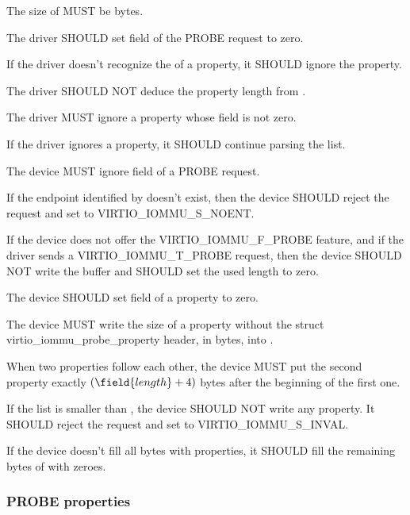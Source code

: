 The size of  MUST be  bytes.

The driver SHOULD set field  of the PROBE request to zero.

If the driver doesn't recognize the  of a property, it SHOULD
ignore the property.

The driver SHOULD NOT deduce the property length from .

The driver MUST ignore a property whose  field is not
zero.

If the driver ignores a property, it SHOULD continue parsing the list.


The device MUST ignore field  of a PROBE request.

If the endpoint identified by  doesn't exist, then the
device SHOULD reject the request and set  to
VIRTIO_IOMMU_S_NOENT.

If the device does not offer the VIRTIO_IOMMU_F_PROBE feature, and if the
driver sends a VIRTIO_IOMMU_T_PROBE request, then the device SHOULD NOT
write the buffer and SHOULD set the used length to zero.

The device SHOULD set field  of a property to zero.

The device MUST write the size of a property without the struct
virtio_iommu_probe_property header, in bytes, into .

When two properties follow each other, the device MUST put the second
property exactly $(\field{length} + 4)$ bytes after the beginning of the
first one.

If the  list is smaller than , the
device SHOULD NOT write any property. It SHOULD reject the request and set
 to VIRTIO_IOMMU_S_INVAL.

If the device doesn't fill all  bytes with properties,
it SHOULD fill the remaining bytes of  with zeroes.

\subsubsection{PROBE properties}\label{sec:Device Types / IOMMU Device / Device operations / PROBE properties}

